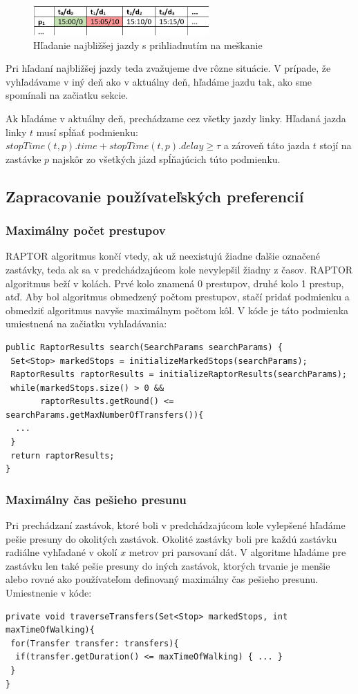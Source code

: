 \begin{figure}[H]
\centerline{\includegraphics[width=0.6\textwidth]{images/shedule-delays}}
\caption[Hľadanie najbližšej jazdy s prihliadnutím na meškanie]{Hľadanie najbližšej jazdy s prihliadnutím na meškanie}
\label{fig:shedule-delays}
\end{figure} 

Pri hľadaní najbližšej jazdy teda zvažujeme dve rôzne situácie. V prípade, že vyhľadávame v iný deň ako v aktuálny deň, hľadáme jazdu tak, ako sme spomínali na začiatku sekcie. 

Ak hľadáme v aktuálny deň, prechádzame cez všetky jazdy linky. Hľadaná jazda linky $t$ musí spĺňať podmienku:
$stopTime(t, p).time + stopTime(t, p).delay \geq \tau$ a zároveň táto jazda $t$ stojí na zastávke $p$ najskôr zo všetkých jázd spĺňajúcich túto podmienku.

\subsection{Zapracovanie používateľských preferencií}
\subsubsection{Maximálny počet prestupov}
RAPTOR algoritmus končí vtedy, ak už neexistujú žiadne ďalšie označené zastávky, teda ak sa v predchádzajúcom kole nevylepšil žiadny z časov. RAPTOR algoritmus beží v kolách. Prvé kolo znamená 0 prestupov, druhé kolo 1 prestup, atď. Aby bol algoritmus obmedzený počtom prestupov, stačí pridať podmienku a obmedziť algoritmus navyše maximálnym počtom kôl. V kóde je táto podmienka umiestnená na začiatku vyhľadávania:
\begin{lstlisting} 
public RaptorResults search(SearchParams searchParams) {
 Set<Stop> markedStops = initializeMarkedStops(searchParams);
 RaptorResults raptorResults = initializeRaptorResults(searchParams);
 while(markedStops.size() > 0 && 
       raptorResults.getRound() <= searchParams.getMaxNumberOfTransfers()){        
  ...
 }
 return raptorResults;
}
\end{lstlisting}

\subsubsection{Maximálny čas pešieho presunu}
Pri prechádzaní zastávok, ktoré boli v predchádzajúcom kole vylepšené hľadáme pešie presuny do okolitých zastávok. Okolité zastávky boli pre každú zastávku radiálne vyhľadané v okolí $x$ metrov pri parsovaní dát. V algoritme hľadáme pre zastávku len také pešie presuny do iných zastávok, ktorých trvanie je menšie alebo rovné ako používateľom definovaný maximálny čas pešieho presunu. Umiestnenie v kóde:
\begin{lstlisting}
private void traverseTransfers(Set<Stop> markedStops, int maxTimeOfWalking){
 for(Transfer transfer: transfers){
  if(transfer.getDuration() <= maxTimeOfWalking) { ... }
 }
}
\end{lstlisting} 

